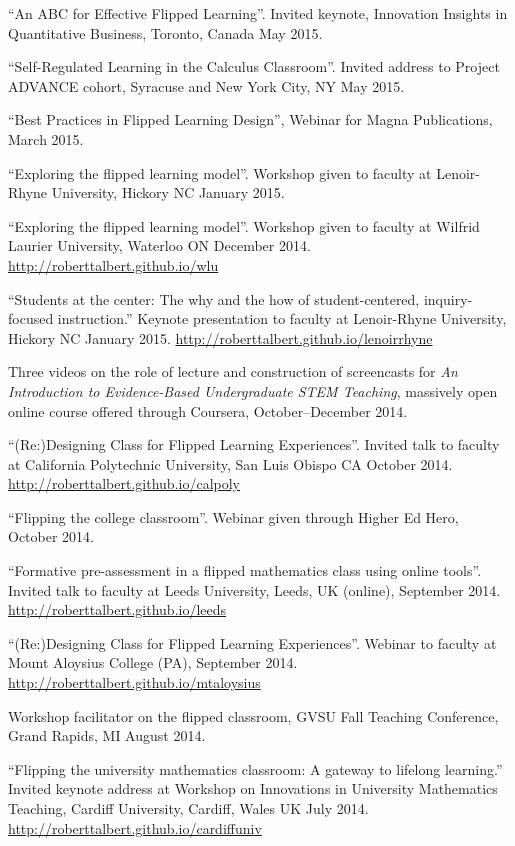 \documentclass[letterpaper]{article}
\renewenvironment{itemize}{
  \begin{list}{}{
    \setlength{\leftmargin}{1.5em}
	\setlength{\itemsep}{0in}
  }
}{
  \end{list}
}
\begin{document}
\begin{itemize}
	\item ``An ABC for Effective Flipped Learning''. Invited keynote, Innovation Insights in Quantitative Business, Toronto, Canada May 2015.  
	\item ``Self-Regulated Learning in the Calculus Classroom''. Invited address to Project ADVANCE cohort, Syracuse and New York City, NY May 2015.
	\item ``Best Practices in Flipped Learning Design'', Webinar for Magna Publications, March 2015.  
	\item ``Exploring the flipped learning model''. Workshop given to faculty at Lenoir-Rhyne University, Hickory NC January 2015. 
	\item ``Exploring the flipped learning model''. Workshop given to faculty at Wilfrid Laurier University, Waterloo ON December 2014. \url{http://roberttalbert.github.io/wlu}
	\item ``Students at the center: The why and the how of student-centered, inquiry-focused instruction.'' Keynote presentation to faculty at Lenoir-Rhyne University, Hickory NC January 2015. \url{http://roberttalbert.github.io/lenoirrhyne}
	\item Three videos on the role of lecture and construction of screencasts for \emph{An Introduction to Evidence-Based Undergraduate STEM Teaching}, massively open online course offered through Coursera, October--December 2014. 
	\item ``(Re:)Designing Class for Flipped Learning Experiences''. Invited talk to faculty at California Polytechnic University, San Luis Obispo CA October 2014. \url{http://roberttalbert.github.io/calpoly}
	\item ``Flipping the college classroom''. Webinar given through Higher Ed Hero, October 2014.
	\item ``Formative pre-assessment in a flipped mathematics class using online tools''. Invited talk to faculty at Leeds University, Leeds, UK (online), September 2014. \url{http://roberttalbert.github.io/leeds}
	\item ``(Re:)Designing Class for Flipped Learning Experiences''. Webinar to faculty at Mount Aloysius College (PA), September 2014. \url{http://roberttalbert.github.io/mtaloysius}
	\item Workshop facilitator on the flipped classroom, GVSU Fall Teaching Conference, Grand Rapids, MI August 2014. 
	\item ``Flipping the university mathematics classroom: A gateway to lifelong learning.'' Invited keynote address at Workshop on Innovations in University Mathematics Teaching, Cardiff University, Cardiff, Wales UK July 2014. \url{http://roberttalbert.github.io/cardiffuniv}

\end{itemize}
\end{document}
